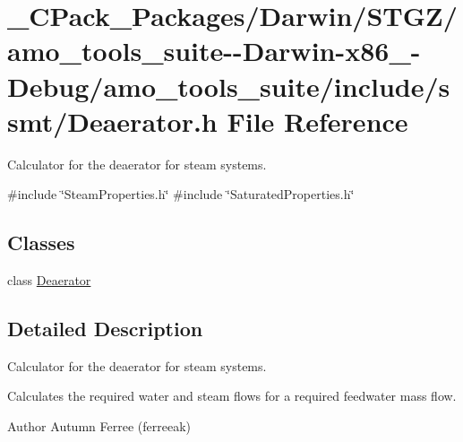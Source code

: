 \hypertarget{___c_pack___packages_2_darwin_2_s_t_g_z_2amo__tools__suite--_darwin-x86__64-_debug_2amo__tools__6912504c2054fb400df5f751a3431330}{}\section{\+\_\+\+C\+Pack\+\_\+\+Packages/\+Darwin/\+S\+T\+G\+Z/amo\+\_\+tools\+\_\+suite-\/-\/\+Darwin-\/x86\+\_-\/\+Debug/amo\+\_\+tools\+\_\+suite/include/ssmt/\+Deaerator.h File Reference}
\label{___c_pack___packages_2_darwin_2_s_t_g_z_2amo__tools__suite--_darwin-x86__64-_debug_2amo__tools__6912504c2054fb400df5f751a3431330}


Calculator for the deaerator for steam systems.  


{\ttfamily \#include \char`\"{}Steam\+Properties.\+h\char`\"{}}\newline
{\ttfamily \#include \char`\"{}Saturated\+Properties.\+h\char`\"{}}\newline
\subsection*{Classes}
\begin{DoxyCompactItemize}
\item 
class \hyperlink{class_deaerator}{Deaerator}
\end{DoxyCompactItemize}


\subsection{Detailed Description}
Calculator for the deaerator for steam systems. 

Calculates the required water and steam flows for a required feedwater mass flow.

\begin{DoxyAuthor}{Author}
Autumn Ferree (ferreeak) 
\end{DoxyAuthor}
